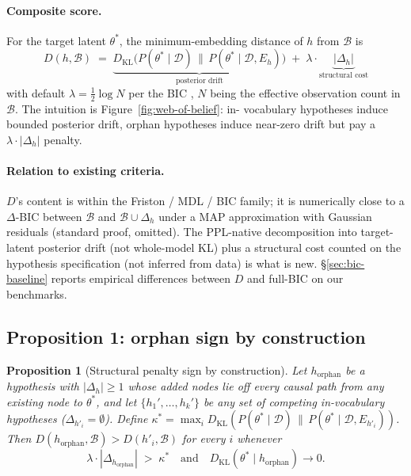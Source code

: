 \documentclass{article}
\newtheorem{proposition}{Proposition}
\begin{document}
\paragraph{Composite score.} For the target latent $\theta^{*}$,
the minimum-embedding distance of $h$ from $\mathcal{B}$ is
\begin{equation}
D(h, \mathcal{B}) \;=\; \underbrace{D_{\mathrm{KL}}\big(
  P(\theta^{*} \mid \mathcal{D}) \,\|\,
  P(\theta^{*} \mid \mathcal{D}, E_{h})\big)}_{\text{posterior drift}}
\;+\;
\lambda \cdot \underbrace{|\Delta_{h}|}_{\text{structural cost}}
\label{eq:D-expanded}
\end{equation}
with default $\lambda = \tfrac{1}{2}\log N$ per the BIC
\citep{schwarz1978}, $N$ being the effective observation count in
$\mathcal{B}$. The intuition is Figure~\ref{fig:web-of-belief}: in-
vocabulary hypotheses induce bounded posterior drift, orphan
hypotheses induce near-zero drift but pay a $\lambda \cdot
|\Delta_{h}|$ penalty.

\paragraph{Relation to existing criteria.} $D$'s content is within
the Friston / MDL / BIC family; it is numerically close to a
$\Delta$-BIC between $\mathcal{B}$ and $\mathcal{B} \cup \Delta_{h}$
under a MAP approximation with Gaussian residuals (standard proof,
omitted). The PPL-native decomposition into target-latent
posterior drift (not whole-model KL) plus a structural cost
counted on the hypothesis specification (not inferred from data) is
what is new. \S\ref{sec:bic-baseline} reports empirical differences
between $D$ and full-BIC on our benchmarks.

\subsection{Proposition 1: orphan sign by construction}
\label{sec:prop1}

\begin{proposition}[Structural penalty sign by construction]
\label{prop:orphan-by-construction}
Let $h_{\mathrm{orphan}}$ be a hypothesis with $|\Delta_{h}| \geq 1$
whose added nodes lie off every causal path from any existing node to
$\theta^{*}$, and let $\{h_{1}', \ldots, h_{k}'\}$ be any set of
competing in-vocabulary hypotheses ($\Delta_{h'_{i}} = \emptyset$).
Define $\kappa^{*} = \max_{i}
D_{\mathrm{KL}}(P(\theta^{*} \mid \mathcal{D}) \,\|\,
P(\theta^{*} \mid \mathcal{D}, E_{h'_{i}}))$. Then
$D(h_{\mathrm{orphan}}, \mathcal{B}) > D(h'_{i}, \mathcal{B})$ for
every $i$ whenever
\begin{equation}
\lambda \cdot |\Delta_{h_{\mathrm{orphan}}}| \;>\; \kappa^{*}
\quad\text{and}\quad
D_{\mathrm{KL}}(\theta^{*} \mid h_{\mathrm{orphan}}) \to 0.
\label{eq:orphan-sign-condition}
\end{equation}
\end{proposition}
\end{document}
